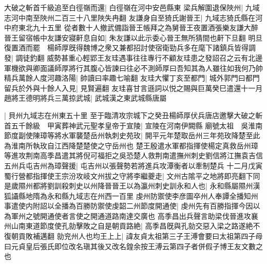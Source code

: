 大破之斬首千級追至白徑嶺而還|{
	白徑嶺在河中安邑縣東}
梁兵解圍退保陜州|{
	九域志河中南至陜州二百三十八里陜失冉翻}
友謙身自至猗氏謝晉王|{
	九域志猗氏縣在河中府東北九十五里}
從者數十人撤武備詣晉王帳拜之為舅晉王夜置酒張樂友謙大醉晉王留宿帳中友謙安寢鼾息自如|{
	朱友謙以此示委心晉王無所猜間也鼾下旦翻}
明旦復置酒而罷　楊師厚旣得魏博之衆又兼都招討使宿衛勁兵多在麾下諸鎮兵皆得調發|{
	調徒釣翻}
威勢甚重心輕郢王友珪遇事往往專行不顧友珪患之發詔召之云有北邊軍機欲與卿面議師厚將行其腹心皆諫曰往必不測師厚曰吾知其為人雖往如我何乃帥精兵萬餘人度河趣洛陽|{
	帥讀曰率趣七喻翻}
友珪大懼丁亥至都門|{
	城外郭門曰都門}
留兵於外與十餘人入見|{
	見賢遍翻}
友珪喜甘言遜詞以悦之賜與巨萬癸巳遣還十一月趙將王德明將兵三萬掠武城|{
	武城漢之東武城縣唐屬}


|{
	貝州九域志在州東五十里}
至于臨清攻宗城下之癸丑楊師厚伏兵唐店邀擊大破之斬首五千餘級　甲寅葬神武元聖孝皇帝于宣陵|{
	宣陵在河南伊闕縣}
廟號太祖　吳淮南節度副使陳璋等將水軍襲楚岳州執刺史苑玫|{
	開平元年楚取岳州三年苑玫降楚至此為淮南所執玫自江西降楚楚使之守岳州也}
楚王殷遣水軍都指揮使楊定真救岳州璋等進攻荆南高季昌遣其將倪可福拒之吳恐楚人救荆南遣撫州刺史劉信將江撫袁吉信五州兵屯吉州為璋聲援|{
	屯吉州以張聲勢若將進兵攻潭衡者以牽制楚兵}
十二月戊寅蜀行營都指揮使王宗汾攻岐文州拔之守將李繼夔走|{
	文州古隂平之地將即亮翻下同}
是歲隰州都將劉訓殺刺史以州降晉晉王以為瀛州刺史訓永和人也|{
	永和縣屬隰州漢狐讘縣地隋為永和縣九域志在州西一百里}
虔州防禦使李彦圖卒州人奉譚全播知州事遣使内附詔以全播為百勝防禦使虔韶二州節度開通使|{
	虔州先有百勝指揮今因以為軍州之號開通使者言使之開通道路南達交廣也}
高季昌出兵聲言助梁伐晉進攻襄州山南東道節度使孔勍擊敗之自是朝貢路絶|{
	高季昌旣與孔勍交惡入梁之路遂絶不復朝貢敗補邁翻}
勍兖州人也均王上上|{
	諱友貞太祖第三子王溥會要曰太祖第四子母曰元貞皇后張氏即位改名瑱其後又改名鍠余按王溥云第四子者併假子博王友文數之也}



